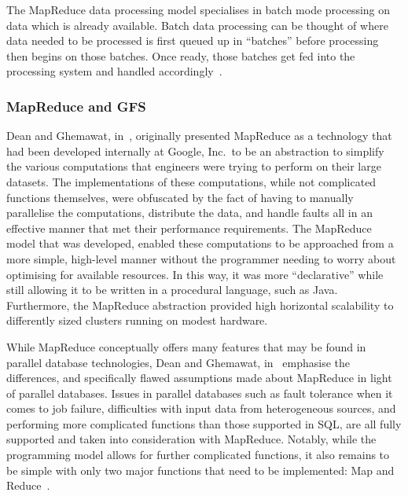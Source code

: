 The MapReduce data processing model specialises in batch mode processing on data which is already available.
Batch data processing can be thought of where data needed to be processed is first queued up in ``batches''
before processing then begins on those batches. Once ready, those batches get fed into the processing system
and handled accordingly~\cite{condie2010online}.


\subsubsection{MapReduce and GFS} %
\label{ssub:mapreduce_and_gfs}

Dean and Ghemawat, in~\cite{dean_mapreduce:_2008}, originally presented MapReduce as a technology that had been
developed internally at Google, Inc.\ to be an abstraction to simplify the various computations that engineers were
trying to perform on their large datasets. The implementations of these computations, while not complicated functions
themselves, were obfuscated by the fact of having to manually parallelise the computations, distribute the data, and
handle faults all in an effective manner that met their performance requirements. The MapReduce model that was developed,
enabled these computations to be approached from a more simple, high-level manner without the programmer needing to worry
about optimising for available resources. In this way, it was more ``declarative'' while still allowing it to be written
in a procedural language, such as Java. Furthermore, the MapReduce abstraction provided high horizontal scalability to
differently sized clusters running on modest hardware.

While MapReduce conceptually offers many features that may be found in parallel database technologies, Dean and
Ghemawat, in~\cite{dean2010mapreduce} emphasise the differences, and specifically flawed assumptions made about MapReduce
in light of parallel databases. Issues in parallel databases such as fault tolerance when it comes to job failure,
difficulties with input data from heterogeneous sources, and performing more complicated functions than those supported
in SQL, are all fully supported and taken into consideration with MapReduce. Notably, while the programming model
allows for further complicated functions, it also remains to be simple with only two major functions that need to be
implemented: Map and Reduce~\cite{pavlo2009comparison}.

